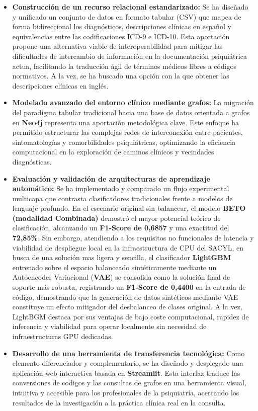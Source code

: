 \documentclass[12pt,a4paper,onecolumn,oneside]{report}
\begin{document}
\begin{itemize}
    \item \textbf{Construcción de un recurso relacional estandarizado:} Se ha diseñado y unificado un conjunto de datos en formato tabular (CSV) que mapea de forma bidireccional los diagnósticos, descripciones clínicas en español y equivalencias entre las codificaciones ICD-9 e ICD-10. Esta aportación propone una alternativa viable de interoperabilidad para mitigar las dificultades de intercambio de información en la documentación psiquiátrica actua, facilitando la traducción ágil de términos médicos libres a códigos normativos. A la vez, se ha buscado una opción con la que obtener las descripciones clínicas en inglés.
    
    \item \textbf{Modelado avanzado del entorno clínico mediante grafos:} La migración del paradigma tabular tradicional hacia una base de datos orientada a grafos en \textbf{Neo4j} representa una aportación metodológica clave. Este enfoque ha permitido estructurar las complejas redes de interconexión entre pacientes, sintomatologías y comorbilidades psiquiátricas, optimizando la eficiencia computacional en la exploración de caminos clínicos y vecindades diagnósticas.
    
    \item \textbf{Evaluación y validación de arquitecturas de aprendizaje automático:} Se ha implementado y comparado un flujo experimental multicapa que contrasta clasificadores tradicionales frente a modelos de lenguaje profundo. En el escenario original sin balancear, el modelo \textbf{BETO (modalidad Combinada)} demostró el mayor potencial teórico de clasificación, alcanzando un \textbf{F1-Score de 0,6857} y una exactitud del \textbf{72,85\%}. Sin embargo, atendiendo a los requisitos no funcionales de latencia y viabilidad de despliegue local en la infraestructura de CPU del SACYL, en busca de una solución mas ligera y sencilla, el clasificador \textbf{LightGBM} entrenado sobre el espacio balanceado sintéticamente mediante un Autoencoder Variacional (\textbf{VAE}) se consolida como la solución final de soporte más robusta, registrando un \textbf{F1-Score de 0,4400} en la entrada de código, demostrando que la generación de datos sintéticos mediante VAE constituye un efecto mitigador del desbalanceo de clases original. A la vez, LightBGM destaca por sus ventajas de bajo coste computacional, rapidez de inferencia y viabilidad para operar localmente sin necesidad de infraestructuras GPU dedicadas.
    
    \item \textbf{Desarrollo de una herramienta de transferencia tecnológica:} Como elemento diferenciador y complementario, se ha diseñado y desplegado una aplicación web interactiva basada en \textbf{Streamlit}. Esta interfaz traduce las conversiones de codigos y las consultas de grafos en una herramienta visual, intuitiva y accesible para los profesionales de la psiquiatría, acercando los resultados de la investigación a la práctica clínica real en la consulta.
\end{itemize}
\end{document}
